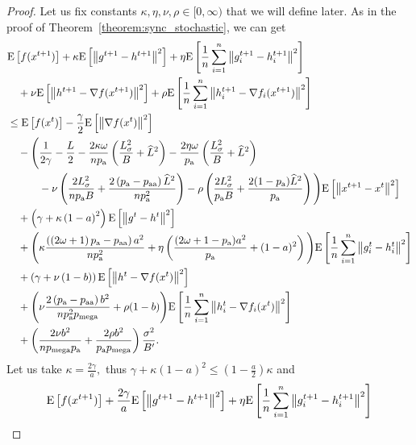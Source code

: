 \documentclass{article}
\newcommand*{\probavailable}{\ensuremath{p_{\textnormal{a}}}}
\newcommand*{\probpairaa}{\ensuremath{p_{\textnormal{aa}}}}
\newcommand*{\probmega}{\ensuremath{p_{\text{mega}}}}
\begin{document}
\begin{proof}
  Let us fix constants $\kappa, \eta, \nu, \rho \in [0,\infty)$ that we will define later. As in the proof of Theorem~\ref{theorem:sync_stochastic}, we can get
  \begin{align*}
    &\Exp{f(x^{t + 1})} + \kappa \Exp{\norm{g^{t+1} - h^{t+1}}^2} + \eta \Exp{\frac{1}{n}\sum_{i=1}^n\norm{g^{t+1}_i - h^{t+1}_i}^2}\\
    &\quad  + \nu \Exp{\norm{h^{t+1} - \nabla f(x^{t+1})}^2} + \rho \Exp{\frac{1}{n}\sum_{i=1}^n\norm{h^{t+1}_i - \nabla f_i(x^{t+1})}^2}\\
    &\leq \Exp{f(x^t)} - \frac{\gamma}{2}\Exp{\norm{\nabla f(x^t)}^2} \\
    &\quad - \Bigg(\frac{1}{2\gamma} - \frac{L}{2} - \frac{2 \kappa  \omega}{n \probavailable}\left(\frac{L_{\sigma}^2}{B} + \widehat{L}^2\right) - \frac{2\eta \omega}{\probavailable} \left(\frac{L_{\sigma}^2}{B} + \widehat{L}^2\right) \\
    &\qquad\quad - \nu \left(\frac{2 L_{\sigma}^2}{n \probavailable B} + \frac{2\left(\probavailable - \probpairaa\right) \widehat{L}^2}{n \probavailable^2}\right) - \rho \left(\frac{2 L_{\sigma}^2}{\probavailable B} + \frac{2(1 - \probavailable) \widehat{L}^2}{\probavailable}\right)\Bigg) \Exp{\norm{x^{t+1} - x^t}^2} \\
    &\quad + \left(\gamma + \kappa \left(1 - a\right)^2\right) \Exp{\norm{g^{t} - h^{t}}^2} \\
    &\quad + \Bigg(\kappa \frac{\left(\left(2 \omega + 1\right)\probavailable - \probpairaa\right)a^2}{n \probavailable^2} + \eta \left(\frac{(2\omega + 1 - \probavailable) a^2}{\probavailable} + (1 - a)^2\right)\Bigg)\Exp{\frac{1}{n}\sum_{i=1}^n\norm{g^{t}_i - h^{t}_i}^2} \\
    &\quad + \left(\gamma + \nu \left(1 - b\right)\right) \Exp{\norm{h^{t} - \nabla f(x^{t})}^2} \\
    &\quad + \Bigg(\nu \frac{2\left(\probavailable - \probpairaa\right) b^2}{n \probavailable^2 \probmega} + \rho (1 - b)\Bigg)\Exp{\frac{1}{n}\sum_{i=1}^n\norm{h^{t}_i - \nabla f_i(x^{t})}^2} \\
    &\quad + \left(\frac{2 \nu b^2}{n \probmega \probavailable} + \frac{2 \rho b^2}{\probavailable \probmega}\right) \frac{\sigma^2}{B'}.
  \end{align*}
  Let us take $\kappa = \frac{2\gamma}{a},$ thus $\gamma + \kappa \left(1 - a\right)^2 \leq \left(1 - \frac{a}{2}\right)\kappa$ and
  \begin{align*}
    &\Exp{f(x^{t + 1})} + \frac{2\gamma}{a} \Exp{\norm{g^{t+1} - h^{t+1}}^2} + \eta \Exp{\frac{1}{n}\sum_{i=1}^n\norm{g^{t+1}_i - h^{t+1}_i}^2}\\

\end{align*}
\end{proof}
\end{document}
